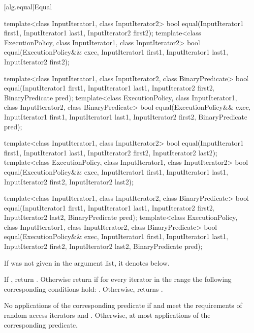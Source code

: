 [alg.equal]{Equal}

%
\begin{itemdecl}
template<class InputIterator1, class InputIterator2>
  bool equal(InputIterator1 first1, InputIterator1 last1,
             InputIterator2 first2);
template<class ExecutionPolicy, class InputIterator1, class InputIterator2>
  bool equal(ExecutionPolicy&& exec,
             InputIterator1 first1, InputIterator1 last1,
             InputIterator2 first2);

template<class InputIterator1, class InputIterator2,
          class BinaryPredicate>
  bool equal(InputIterator1 first1, InputIterator1 last1,
             InputIterator2 first2, BinaryPredicate pred);
template<class ExecutionPolicy, class InputIterator1, class InputIterator2,
         class BinaryPredicate>
  bool equal(ExecutionPolicy&& exec,
             InputIterator1 first1, InputIterator1 last1,
             InputIterator2 first2, BinaryPredicate pred);

template<class InputIterator1, class InputIterator2>
  bool equal(InputIterator1 first1, InputIterator1 last1,
             InputIterator2 first2, InputIterator2 last2);
template<class ExecutionPolicy, class InputIterator1, class InputIterator2>
  bool equal(ExecutionPolicy&& exec,
             InputIterator1 first1, InputIterator1 last1,
             InputIterator2 first2, InputIterator2 last2);

template<class InputIterator1, class InputIterator2,
           class BinaryPredicate>
  bool equal(InputIterator1 first1, InputIterator1 last1,
             InputIterator2 first2, InputIterator2 last2,
             BinaryPredicate pred);
template<class ExecutionPolicy, class InputIterator1, class InputIterator2,
         class BinaryPredicate>
  bool equal(ExecutionPolicy&& exec,
             InputIterator1 first1, InputIterator1 last1,
             InputIterator2 first2, InputIterator2 last2,
             BinaryPredicate pred);
\end{itemdecl}

\begin{itemdescr}
\pnum
\remarks If  was not given in the argument list, it denotes
 below.

\pnum
\returns
If
,
return
.
Otherwise return
if for every iterator
in the range 
the following corresponding conditions hold:
.
Otherwise, returns
.

\pnum
\complexity
No applications of the corresponding predicate if
and
meet the requirements of random access iterators and
.
Otherwise, at most
applications of the corresponding predicate.
\end{itemdescr}

